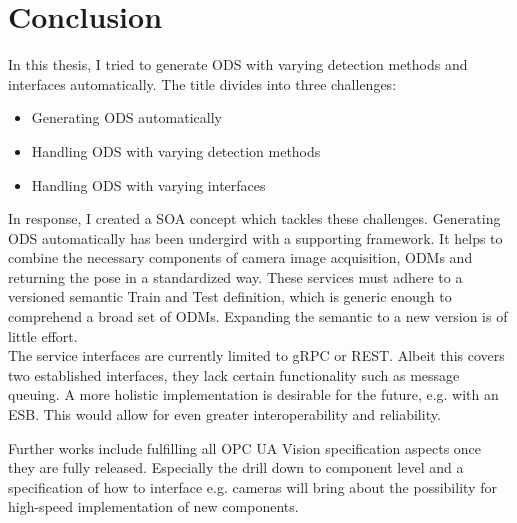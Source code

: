 \chapter{Conclusion\label{cha:chapter7}}

In this thesis, I tried to generate ODS with varying detection methods and interfaces automatically. The title divides into three challenges:
\begin{itemize}
    \item Generating ODS automatically
    \item Handling ODS with varying detection methods
    \item Handling ODS with varying interfaces
\end{itemize}
In response, I created a SOA concept which tackles these challenges. Generating ODS automatically has been undergird with a supporting framework. It helps to combine the necessary components of camera image acquisition, ODMs and returning the pose in a standardized way. These services must adhere to a versioned semantic Train and Test definition, which is generic enough to comprehend a broad set of ODMs. Expanding the semantic to a new version is of little effort.\\
The service interfaces are currently limited to gRPC or REST. Albeit this covers two established interfaces, they lack certain functionality such as message queuing. A more holistic implementation is desirable for the future, e.g. with an ESB. This would allow for even greater interoperability and reliability.

Further works include fulfilling all OPC UA Vision specification aspects once they are fully released. Especially the drill down to component level and a specification of how to interface e.g. cameras will bring about the possibility for high-speed implementation of new components.